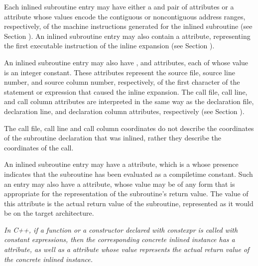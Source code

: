 Each inlined subroutine entry may have either a 
and  pair of attributes or a 
attribute whose values encode the contiguous or non\dash contiguous
address ranges, respectively, of the machine instructions
generated for the inlined subroutine (see 
Section ). An
inlined subroutine entry may also contain a 
attribute, representing the first executable instruction of
the inline expansion (see 
Section ).

An inlined subroutine entry may also have ,
 and  attributes, 
each of whose
value is an integer constant. These attributes represent the
source file, source line number, and source column number,
respectively, of the first character of the statement or
expression that caused the inline expansion. The call file,
call line, and call column attributes are interpreted in
the same way as the declaration file, declaration line, and
declaration column attributes, respectively (see 
Section ).

The call file, call line and call column coordinates do not
describe the coordinates of the subroutine declaration that
was inlined, rather they describe the coordinates of the call.

An inlined subroutine entry may have a 
attribute, which is a  
whose presence indicates that the
subroutine has been evaluated as a compile\dash time constant. Such
an entry may also have a  attribute,
whose value may be of any form that is appropriate for the
representation of the subroutine's return value. The value of
this attribute is the actual return value of the subroutine,
represented as it would be on the target architecture.

\textit{In C++, if a function or a constructor declared with constexpr
is called with constant expressions, then the corresponding
concrete inlined instance has a  attribute,
as well as a  attribute whose value represents
the actual return value of the concrete inlined instance.}

